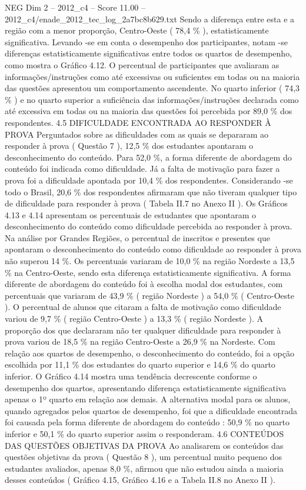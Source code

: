 \begin{textsample}{NEG Dim 2 – 2012\_c4 – Score 11.00 – 2012\_c4/enade\_2012\_tec\_log\_2a7bc8b629.txt}
Sendo a diferença entre esta e a região com a menor proporção, Centro-Oeste ( 78,4 \% ), estatisticamente significativa.
Levando -se em conta o desempenho dos participantes, notam -se diferenças estatisticamente significativas entre todos os quartos de desempenho, como mostra o Gráfico 4.12.
O percentual de participantes que avaliaram as informações/instruções como até excessivas ou suficientes em todas ou na maioria das questões apresentou um comportamento ascendente.
No quarto inferior ( 74,3 \% ) e no quarto superior a suficiência das informações/instruções declarada como até excessiva em todas ou na maioria das questões foi percebida por 89,0 \% dos respondentes. 4.5 DIFICULDADE ENCONTRADA AO RESPONDER À PROVA Perguntados sobre as dificuldades com as quais se depararam ao responder à prova ( Questão 7 ), 12,5 \% dos estudantes apontaram o desconhecimento do conteúdo.
Para 52,0 \%, a forma diferente de abordagem do conteúdo foi indicada como dificuldade.
Já a falta de motivação para fazer a prova foi a dificuldade apontada por 10,4 \% dos respondentes.
Considerando -se todo o Brasil, 20,6 \% dos respondentes afirmaram que não tiveram qualquer tipo de dificuldade para responder à prova ( Tabela II.7 no Anexo II ).
Os Gráficos 4.13 e 4.14 apresentam os percentuais de estudantes que apontaram o desconhecimento do conteúdo como dificuldade percebida ao responder à prova.
Na análise por Grandes Regiões, o percentual de inscritos e presentes que apontaram o desconhecimento do conteúdo como dificuldade ao responder à prova não superou 14 \%.
Os percentuais variaram de 10,0 \% na região Nordeste a 13,5 \% na Centro-Oeste, sendo esta diferença estatisticamente significativa.
A forma diferente de abordagem do conteúdo foi à escolha modal dos estudantes, com percentuais que variaram de 43,9 \% ( região Nordeste ) a 54,0 \% ( Centro-Oeste ).
O percentual de alunos que citaram a falta de motivação como dificuldade variou de 9,7 \% ( região Centro-Oeste ) a 13,3 \% ( região Nordeste ).
A proporção dos que declararam não ter qualquer dificuldade para responder à prova variou de 18,5 \% na região Centro-Oeste a 26,9 \% na Nordeste.
Com relação aos quartos de desempenho, o desconhecimento do conteúdo, foi a opção escolhida por 11,1 \% dos estudantes do quarto superior e 14,6 \% do quarto inferior.
O Gráfico 4.14 mostra uma tendência decrescente conforme o desempenho dos quartos, apresentando diferença estatisticamente significativa apenas o 1º quarto em relação aos demais.
A alternativa modal para os alunos, quando agregados pelos quartos de desempenho, foi que a dificuldade encontrada foi causada pela forma diferente de abordagem do conteúdo : 50,9 \% no quarto inferior e 50,1 \% do quarto superior assim o responderam. 4.6 CONTEÚDOS DAS QUESTÕES OBJETIVAS DA PROVA Ao analisarem os conteúdos das questões objetivas da prova ( Questão 8 ), um percentual muito pequeno dos estudantes avaliados, apenas 8,0 \%, afirmou que não estudou ainda a maioria desses conteúdos ( Gráfico 4.15, Gráfico 4.16 e a Tabela II.8 no Anexo II ).

\end{textsample}
